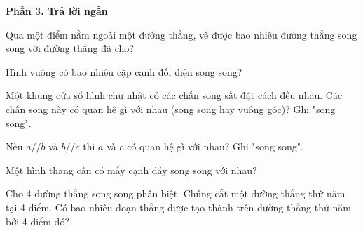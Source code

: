 \textbf{Phần 3. Trả lời ngắn}

\begin{ex} %
Qua một điểm nằm ngoài một đường thẳng, vẽ được bao nhiêu đường thẳng song song với đường thẳng đã cho?
\end{ex}

\begin{ex} %
Hình vuông có bao nhiêu cặp cạnh đối diện song song?
\end{ex}

\begin{ex} %
Một khung cửa sổ hình chữ nhật có các chấn song sắt đặt cách đều nhau. Các chấn song này có quan hệ gì với nhau (song song hay vuông góc)? Ghi "song song".
\end{ex}

\begin{ex} %
Nếu $a // b$ và $b // c$ thì $a$ và $c$ có quan hệ gì với nhau? Ghi "song song".
\end{ex}

\begin{ex} %
Một hình thang cân có mấy cạnh đáy song song với nhau?
\end{ex}

\begin{ex} %
Cho 4 đường thẳng song song phân biệt. Chúng cắt một đường thẳng thứ năm tại 4 điểm. Có bao nhiêu đoạn thẳng được tạo thành trên đường thẳng thứ năm bởi 4 điểm đó?
\end{ex}
